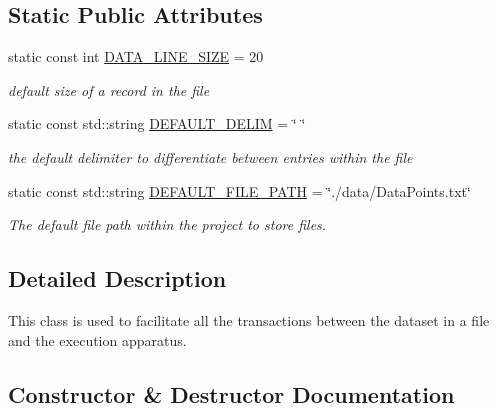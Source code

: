 \subsection*{Static Public Attributes}
\begin{DoxyCompactItemize}
\item 
\mbox{\label{classData_a9e44f560bc6b2351c85113aa672b0438}} 
static const int \hyperlink{classData_a9e44f560bc6b2351c85113aa672b0438}{D\+A\+T\+A\+\_\+\+L\+I\+N\+E\+\_\+\+S\+I\+ZE} = 20
\begin{DoxyCompactList}\small\item\em default size of a record in the file \end{DoxyCompactList}\item 
\mbox{\label{classData_a7cd8e308ca67c200fb41b24895906590}} 
static const std\+::string \hyperlink{classData_a7cd8e308ca67c200fb41b24895906590}{D\+E\+F\+A\+U\+L\+T\+\_\+\+D\+E\+L\+IM} = \char`\"{} \char`\"{}
\begin{DoxyCompactList}\small\item\em the default delimiter to differentiate between entries within the file \end{DoxyCompactList}\item 
\mbox{\label{classData_ac8b591702bba6d5566ec196f8e14c78c}} 
static const std\+::string \hyperlink{classData_ac8b591702bba6d5566ec196f8e14c78c}{D\+E\+F\+A\+U\+L\+T\+\_\+\+F\+I\+L\+E\+\_\+\+P\+A\+TH} = \char`\"{}./data/Data\+Points.\+txt\char`\"{}
\begin{DoxyCompactList}\small\item\em The default file path within the project to store files. \end{DoxyCompactList}\end{DoxyCompactItemize}


\subsection{Detailed Description}
This class is used to facilitate all the transactions between the dataset in a file and the execution apparatus. 

\subsection{Constructor \& Destructor Documentation}
\mbox{\label{classData_aa47da7ace142c56f5f4fc1109ec8f7b0}} 
